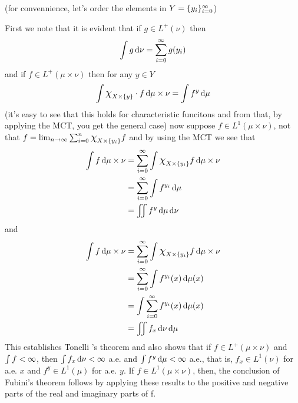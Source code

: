 \documentclass{article}
\begin{document}
\begin{homeworkProblem}[52]
    (for convennience, let's order the elements in $Y=\{y_i\}_{i=0}^\infty$)
    
    First we note that it is evident that if $g\in L^+(\nu)$ then
    \[\int g\mathop{}\!\mathrm{d}\nu = \sum_{i=0}^\infty g(y_i)\]
    and if $f\in L^+(\mu\times\nu)$ then for any $y\in Y$
    \[\int \Chi_{X\times \{y\}} \cdot f\dd\mu\times\nu = \int f^y\dd\mu\]
    (it's easy to see that this holds for characteristic funcitons and from that, by applying the MCT, you get the general case) now suppose $f\in L^1(\mu\times\nu)$, not that $f=\lim_{n\to\i}\sum_{i=0}^n \Chi_{X\times \{y_i\}}f$ and by using the MCT we see that
    \begin{align*}
        \int f \dd\mu\times\nu &= \sum_{i=0}^\i\int \Chi_{X\times \{y_i\}} f\dd\mu\times\nu \\
        &= \sum_{i=0}^\i\int f^{y_i}\dd\mu \\
        &= \iint f^y\dd\mu\dd\nu
    \end{align*}
    and
    \begin{align*}
        \int f \dd\mu\times\nu &= \sum_{i=0}^\i\int \Chi_{X\times \{y_i\}} f\dd\mu\times\nu \\
        &= \sum_{i=0}^\i\int f^{y_i}(x)\dd\mu(x) \\
        &= \int \sum_{i=0}^\i f^{y_i}(x)\dd\mu(x) \\
        &= \iint f_x\dd\nu\dd\mu
    \end{align*}
    This establishes Tonelli 's theorem and also shows that if $f\in L^+(\mu\times\nu)$ and $\int f<\infty$, then $\int f_x\mathop{}\!\mathrm{d}\nu<\infty$ a.e. and $\int f^y\mathop{}\!\mathrm{d}\mu<\infty$ a.e., that is, $f_x\in L^1(\nu)$ for a.e. $x$ and $f^y \in L^1(\mu)$ for a.e. $y$. If $f\in L^1(\mu\times\nu)$, then, the conclusion of Fubini's theorem follows by applying these results to the positive and
negative parts of the real and imaginary parts of f. 
\end{homeworkProblem}
\end{document}
